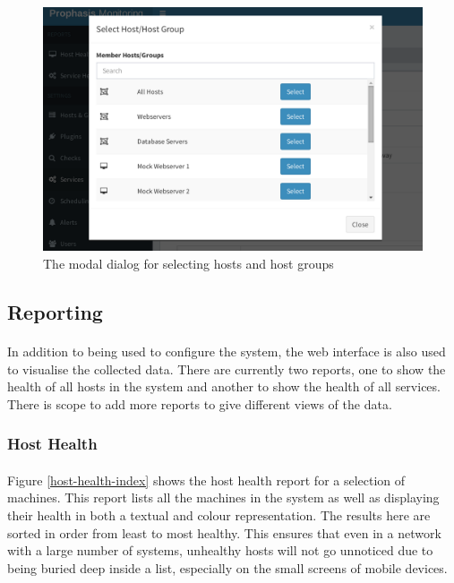 \documentclass[bsc,logo,twoside,singlespacing,notimes]{infthesis}
\begin{document}
\begin{figure}[H]
	\centering
	\caption{The modal dialog for selecting hosts and host groups}
	\label{edit-service-modal}
	\includegraphics[scale=0.44]{assets/screenshots/edit-service-modal.pdf}
\end{figure}

\subsection{Reporting}
\paragraph*{}
	In addition to being used to configure the system, the web interface is also
	used to visualise the collected data.  There are currently two reports, one
	to show the health of all hosts in the system and another to show the health
	of all services.  There is scope to add more reports to give different views
	of the data.  
\subsubsection{Host Health}
\paragraph*{}
	Figure \ref{host-health-index} shows the host health report for
	a selection of machines.  This report lists all the machines in the system
	as well as displaying their health in both a textual and colour representation.
	The results here are sorted in order from least to most healthy.  This ensures
	that even in a network with a large number of systems, unhealthy hosts will not
	go unnoticed due to being buried deep inside a list, especially on the small
	screens of mobile devices.
	
\end{document}
